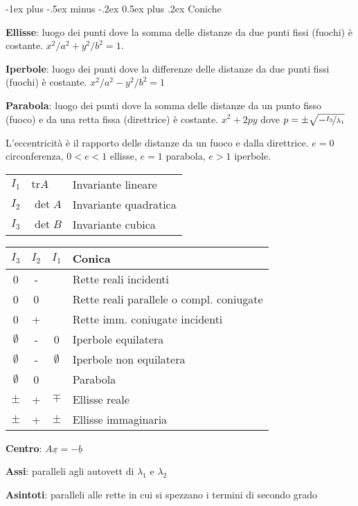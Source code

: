 \documentclass[10pt,landscape]{article}
\makeatletter
\renewcommand{\section}{\@startsection{section}{1}{0mm}%
                                {-1ex plus -.5ex minus -.2ex}%
                                {0.5ex plus .2ex}%
                                {\normalfont\large\bfseries}}
\renewcommand{\vec}[1]{\underline{#1}}
\newcommand{\tr}{\mathrm{tr}}
\makeatother
\begin{document}
\begin{multicols}{3}
\section{Coniche}

\textbf{Ellisse}: luogo dei punti dove la somma delle distanze da due punti fissi (fuochi) è costante. $x^2/a^2 + y^2/b^2 = 1$.

\textbf{Iperbole}: luogo dei punti dove la differenze delle distanze da due punti fissi (fuochi) è costante. $x^2/a^2 - y^2/b^2 = 1$

\textbf{Parabola}: luogo dei punti dove la somma delle distanze da un punto fisso (fuoco) e da una retta fissa (direttrice) è costante. $x^2+2py$ dove $p=\pm \sqrt{-\nicefrac{I_3}{\lambda_1}}$

L'eccentricità è il rapporto delle distanze da un fuoco e dalla direttrice. $e = 0$ circonferenza, $0 < e < 1$ ellisse, $e = 1$ parabola, $e > 1$ iperbole. 

\begin{tabular}{lll}
	$I_1$ & $\tr A$ & Invariante lineare \\
	$I_2$ & $\det A$ & Invariante quadratica \\
	$I_3$ & $\det B$ & Invariante cubica
\end{tabular}

\begin{tabular}{c|c|c|l}
	$I_3$ & $I_2$ & $I_1$ & Conica \\
	\hline
	0     & -     &       & Rette reali incidenti \\
	0     & 0     &       & Rette reali parallele o compl. coniugate \\
	0     & +     &       & Rette imm. coniugate incidenti \\
	\hline
	$\emptyset$ & -     & 0     & Iperbole equilatera \\
	$\emptyset$ & -     & $\emptyset$ & Iperbole non equilatera \\
	$\emptyset$ & 0     &       & Parabola \\
	$\pm$ & +     & $\mp$ & Ellisse reale \\
	$\pm$ & +     & $\pm$ & Ellisse immaginaria \\
	\hline
\end{tabular}

\textbf{Centro}: $A\vec{x} = -\vec{b}$

\textbf{Assi}: paralleli agli autovett di $\lambda_1$ e $\lambda_2$

\textbf{Asintoti}: paralleli alle rette in cui si spezzano i termini di secondo grado


\end{multicols}
\end{document}
